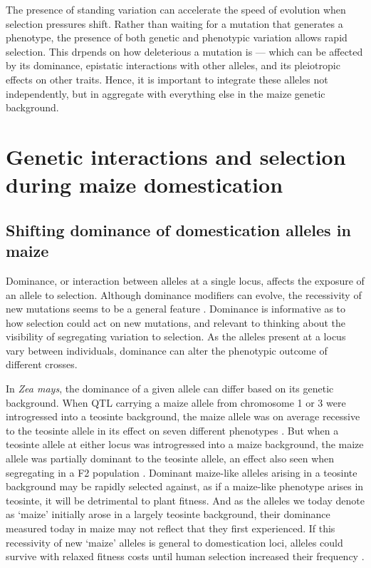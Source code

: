 \documentclass[a4paper]{article}
\newcommand{\mcs}[1]{\todo[size=\tiny, color=magenta!20]{#1}}
\begin{document}
﻿The presence of standing variation can accelerate the speed of evolution when selection pressures shift.
Rather than waiting for a mutation that generates a phenotype, the presence of both genetic and phenotypic variation allows rapid selection.
This drpends on how deleterious a mutation is --- which can be affected by its dominance, epistatic interactions with other alleles, and its pleiotropic effects on other traits.
Hence, it is important to integrate these alleles not independently, but in aggregate with everything else in the maize genetic background. \mcs{this does not mean what you mean to say}
﻿
\section*{Genetic interactions and selection during maize domestication}
\subsection*{Shifting dominance of domestication alleles in maize}

﻿Dominance, or interaction between alleles at a single locus, affects the exposure of an allele to selection.
Although dominance modifiers can evolve, the recessivity of new mutations seems to be a general feature \citep{orr1991}.
﻿Dominance is informative as to how selection could act on new mutations, and relevant to thinking about the visibility of segregating variation to selection.
﻿As the alleles present at a locus vary between individuals, dominance can alter the phenotypic outcome of different crosses.

﻿In \textit{Zea mays}, the dominance of a given allele can differ based on its genetic background.
When QTL carrying a maize allele from chromosome 1 or 3 were introgressed into a teosinte background, the maize allele was on average recessive to the teosinte allele in its effect on seven different phenotypes \citep{doebley1995}.
﻿But when a teosinte allele at either locus was introgressed into a maize background, the maize allele was partially dominant to the teosinte allele, an effect also seen when segregating in a F2 population \citep{doebley1995}.
Dominant maize-like alleles arising in a teosinte background may be rapidly selected against, as if a maize-like phenotype arises in teosinte, it will be detrimental to plant fitness.
And as the alleles we today denote as `maize' initially arose in a largely teosinte background, their dominance measured today in maize  may not reflect that they first experienced.
﻿If this recessivity of new `maize' alleles is general to domestication loci, alleles could survive with relaxed fitness costs until human selection increased their frequency \citep{doebley1995, lauter2002}.
\end{document}
